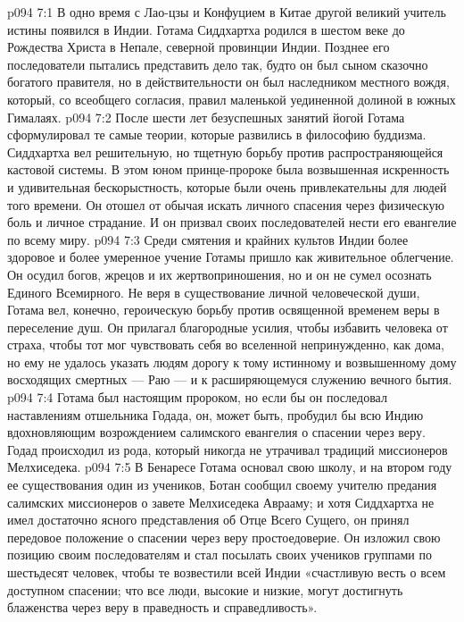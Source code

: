 \vs p094 7:1 В одно время с Лао\hyp{}цзы и Конфуцием в Китае другой великий учитель истины появился в Индии. Готама Сиддхартха родился в шестом веке до Рождества Христа в Непале, северной провинции Индии. Позднее его последователи пытались представить дело так, будто он был сыном сказочно богатого правителя, но в действительности он был наследником местного вождя, который, со всеобщего согласия, правил маленькой уединенной долиной в южных Гималаях.
\vs p094 7:2 После шести лет безуспешных занятий йогой Готама сформулировал те самые теории, которые развились в философию буддизма. Сиддхартха вел решительную, но тщетную борьбу против распространяющейся кастовой системы. В этом юном принце\hyp{}пророке была возвышенная искренность и удивительная бескорыстность, которые были очень привлекательны для людей того времени. Он отошел от обычая искать личного спасения через физическую боль и личное страдание. И он призвал своих последователей нести его евангелие по всему миру.
\vs p094 7:3 Среди смятения и крайних культов Индии более здоровое и более умеренное учение Готамы пришло как живительное облегчение. Он осудил богов, жрецов и их жертвоприношения, но и он не сумел осознать  Единого Всемирного. Не веря в существование личной человеческой души, Готама вел, конечно, героическую борьбу против освященной временем веры в переселение душ. Он прилагал благородные усилия, чтобы избавить человека от страха, чтобы тот мог чувствовать себя во вселенной непринужденно, как дома, но ему не удалось указать людям дорогу к тому истинному и возвышенному дому восходящих смертных --- Раю --- и к расширяющемуся служению вечного бытия.
\vs p094 7:4 Готама был настоящим пророком, но если бы он последовал наставлениям отшельника Годада, он, может быть, пробудил бы всю Индию вдохновляющим возрождением салимского евангелия о спасении через веру. Годад происходил из рода, который никогда не утрачивал традиций миссионеров Мелхиседека.
\vs p094 7:5 В Бенаресе Готама основал свою школу, и на втором году ее существования один из учеников, Ботан сообщил своему учителю предания салимских миссионеров о завете Мелхиседека Аврааму; и хотя Сиддхартха не имел достаточно ясного представления об Отце Всего Сущего, он принял передовое положение о спасении через веру простоедоверие. Он изложил свою позицию своим последователям и стал посылать своих учеников группами по шестьдесят человек, чтобы те возвестили всей Индии «счастливую весть о всем доступном спасении; что все люди, высокие и низкие, могут достигнуть блаженства через веру в праведность и справедливость».
